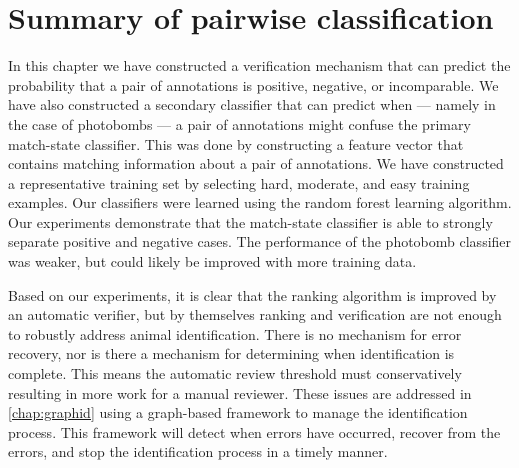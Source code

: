 \section{Summary of pairwise classification}\label{sec:pairconclusion}

    In this chapter we have constructed a verification mechanism that can predict the probability that a pair of
      annotations is positive, negative, or incomparable.
    We have also constructed a secondary classifier that can predict when --- namely in the case of photobombs
      --- a pair of annotations might confuse the primary match-state classifier.
    This was done by constructing a feature vector that contains matching information about a pair of
      annotations.
    We have constructed a representative training set by selecting hard, moderate, and easy training examples.
    Our classifiers were learned using the random forest learning algorithm.
    Our experiments demonstrate that the match-state classifier is able to strongly separate positive and
      negative cases.
    The performance of the photobomb classifier was weaker, but could likely be improved with more training data.

    Based on our experiments, it is clear that the ranking algorithm is improved by an automatic verifier, but by
      themselves ranking and verification are not enough to robustly address animal identification.
    There is no mechanism for error recovery, nor is there a mechanism for determining when identification is
      complete.
    This means the automatic review threshold must conservatively resulting in more work for a manual reviewer.
    These issues are addressed in \cref{chap:graphid} using a graph-based framework to manage the identification
      process.
    This framework will detect when errors have occurred, recover from the errors, and stop the identification
      process in a timely manner.
